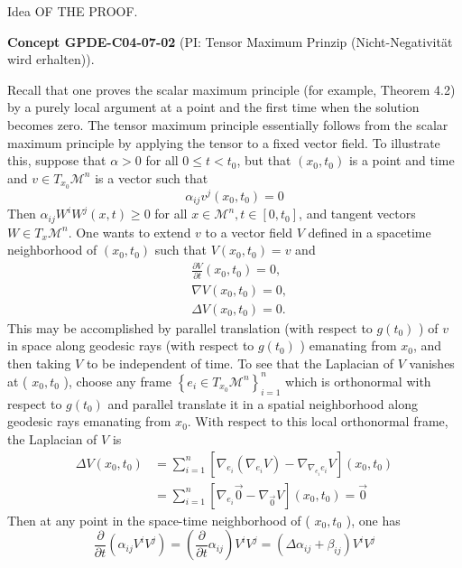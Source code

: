 \documentclass[10pt, letterpaper]{article}
\newcommand{\CustomHeading}[3]{%
  \par\medskip\noindent%
  \textbf{#1 #2} \textnormal{(#3)}.\enskip%
}
\newenvironment{CONC}[2]{\begin{unitbox}\CustomHeading{Concept}{#1}{#2}}{\end{unitbox}}
\begin{document}
Idea OF THE PROOF. 

\begin{CONC}{GPDE-C04-07-02}{PI: Tensor Maximum Prinzip (Nicht-Negativität wird erhalten)}
Recall that one proves the scalar maximum principle (for example, Theorem 4.2) by a purely local argument at a point and the first time when the solution becomes zero. The tensor maximum principle essentially follows from the scalar maximum principle by applying the tensor to a fixed vector field. To illustrate this, suppose that $\alpha>0$ for all $0 \leq t<t_0$, but that $\left(x_0, t_0\right)$ is a point and time and $v \in T_{x_0} \mathcal{M}^n$ is a vector such that
$$
\alpha_{i j} v^j\left(x_0, t_0\right)=0
$$
Then $\alpha_{i j} W^i W^j(x, t) \geq 0$ for all $x \in \mathcal{M}^n, t \in\left[0, t_0\right]$, and tangent vectors $W \in T_x \mathcal{M}^n$. One wants to extend $v$ to a vector field $V$ defined in a spacetime neighborhood of $\left(x_0, t_0\right)$ such that $V\left(x_0, t_0\right)=v$ and
$$
\begin{aligned}
& \frac{\partial V}{\partial t}\left(x_0, t_0\right)=0, \\
& \nabla V\left(x_0, t_0\right)=0, \\
& \Delta V\left(x_0, t_0\right)=0 .
\end{aligned}
$$
This may be accomplished by parallel translation (with respect to $g\left(t_0\right)$ ) of $v$ in space along geodesic rays (with respect to $g\left(t_0\right)$ ) emanating from $x_0$, and then taking $V$ to be independent of time. To see that the Laplacian of $V$ vanishes at ( $x_0, t_0$ ), choose any frame $\left\{e_i \in T_{x_0} \mathcal{M}^n\right\}_{i=1}^n$ which is orthonormal with respect to $g\left(t_0\right)$ and parallel translate it in a spatial neighborhood along geodesic rays emanating from $x_0$. With respect to this local orthonormal frame, the Laplacian of $V$ is
$$
\begin{aligned}
\Delta V\left(x_0, t_0\right) & =\sum_{i=1}^n\left[\nabla_{e_i}\left(\nabla_{e_i} V\right)-\nabla_{\nabla_{e_i} e_i} V\right]\left(x_0, t_0\right) \\
& =\sum_{i=1}^n\left[\nabla_{e_i} \overrightarrow{0}-\nabla_{\overrightarrow{0}} V\right]\left(x_0, t_0\right)=\overrightarrow{0}
\end{aligned}
$$
Then at any point in the space-time neighborhood of ( $x_0, t_0$ ), one has
$$
\frac{\partial}{\partial t}\left(\alpha_{i j} V^i V^j\right)=\left(\frac{\partial}{\partial t} \alpha_{i j}\right) V^i V^j=\left(\Delta \alpha_{i j}+\beta_{i j}\right) V^i V^j
$$
\end{CONC}
\end{document}
